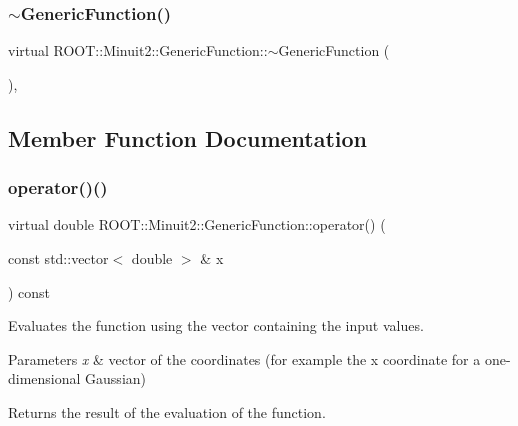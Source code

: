 \mbox{\label{classROOT_1_1Minuit2_1_1GenericFunction_ac1d198b822e43d3936286cc580c3e035}} 
\subsubsection{\texorpdfstring{$\sim$GenericFunction()}{~GenericFunction()}\hspace{0.1cm}{\footnotesize\ttfamily [3/3]}}
{\footnotesize\ttfamily virtual R\+O\+O\+T\+::\+Minuit2\+::\+Generic\+Function\+::$\sim$\+Generic\+Function (\begin{DoxyParamCaption}{ }\end{DoxyParamCaption})\hspace{0.3cm}{\ttfamily [inline]}, {\ttfamily [virtual]}}



\subsection{Member Function Documentation}
\mbox{\label{classROOT_1_1Minuit2_1_1GenericFunction_a0d6039ad9aa18e475534d1fd80342e9d}} 
\subsubsection{\texorpdfstring{operator()()}{operator()()}\hspace{0.1cm}{\footnotesize\ttfamily [1/3]}}
{\footnotesize\ttfamily virtual double R\+O\+O\+T\+::\+Minuit2\+::\+Generic\+Function\+::operator() (\begin{DoxyParamCaption}\item[{const std\+::vector$<$ double $>$ \&}]{x }\end{DoxyParamCaption}) const\hspace{0.3cm}{\ttfamily [pure virtual]}}

Evaluates the function using the vector containing the input values.


\begin{DoxyParams}{Parameters}
{\em x} & vector of the coordinates (for example the x coordinate for a one-\/dimensional Gaussian)\\
\hline
\end{DoxyParams}
\begin{DoxyReturn}{Returns}
the result of the evaluation of the function. 
\end{DoxyReturn}



